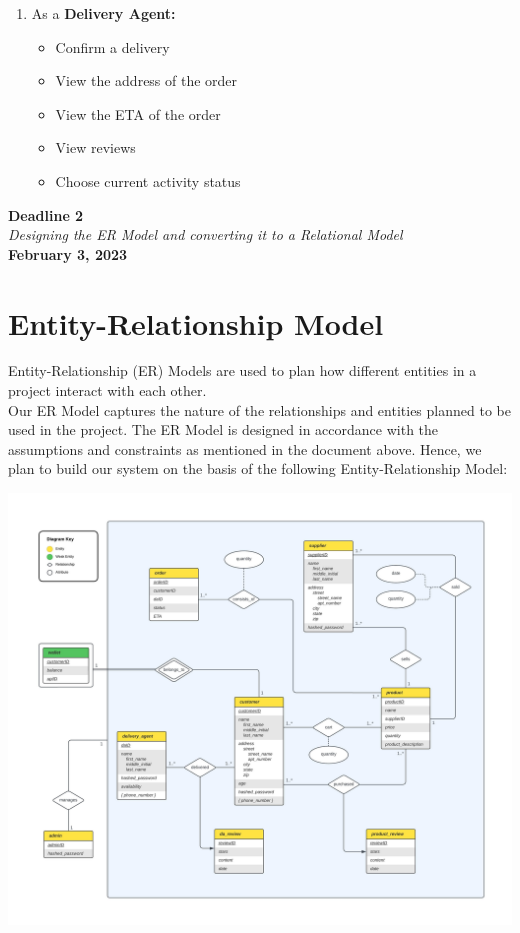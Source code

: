 \documentclass[12pt]{report}
\newcommand{\deadline}[3]{
    \hspace{0pt}
    \vfill
    \begin{center}
        \Huge \textbf{Deadline #1} \\
        \vspace*{5pt}
        \Large \textit{#2} \\
        \vspace*{25pt}
        \large \textbf{#3}
    \end{center}
    \vfill
    \pagebreak
}
\begin{document}
\begin{enumerate}
        \item As a \textbf{Delivery Agent:}
        \begin{itemize}
            \item Confirm a delivery
            \item View the address of the order
            \item View the ETA of the order
            \item View reviews
            \item Choose current activity status
        \end{itemize}
    \end{enumerate}

    \pagebreak

    \deadline{2}{Designing the ER Model and converting it to a Relational Model}{February 3, 2023}

    \section*{\Huge Entity-Relationship Model}
    \vspace*{10pt}
    Entity-Relationship (ER) Models are used to plan how different entities in a project interact with each other. \\
    \newline
    Our ER Model captures the nature of the relationships and entities planned to be used in the project.
    The ER Model is designed in accordance with the assumptions and constraints as mentioned in the document above.
    Hence, we plan to build our system on the basis of the following Entity-Relationship Model:
    \vspace*{10pt}
    \begin{center}
        \hspace*{-37pt}
        \includegraphics[scale=0.6]{Assets/ER-Model}
    \end{center}
\end{document}
